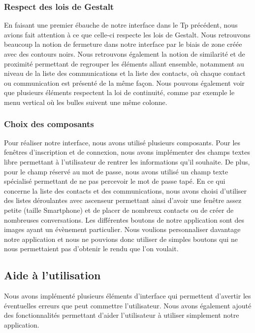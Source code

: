 \documentclass[11pt]{article}
\begin{document}
\subsubsection{Respect des lois de Gestalt}
En faisant une premier ébauche de notre interface dans le Tp précédent, nous avions fait attention à ce que celle-ci respecte les lois de Gestalt. Nous retrouvons beaucoup la notion de fermeture dans notre interface par le biais de zone créée avec des contours noirs. Nous retrouvons également la notion de similarité et de proximité permettant de regrouper les éléments allant ensemble, notamment au niveau de la liste des communications et la liste des contacts, où chaque contact ou communication est présenté de la même façon. Nous pouvons également voir que plusieurs éléments respectent la loi de continuité, comme par exemple le menu vertical où les bulles suivent une même colonne.

\subsubsection{Choix des composants}
Pour réaliser notre interface, nous avons utilisé plusieurs composants. Pour les fenêtres d'inscription et de connexion, nous avons implémenter des champs textes libre permettant à l'utilisateur de rentrer les informations qu'il souhaite. De plus, pour le champ réservé au mot de passe, nous avons utilisé un champ texte spécialisé permettant de ne pas percevoir le mot de passe tapé. En ce qui concerne la liste des contacts et des communications, nous avons choisi d'utiliser des listes déroulantes avec ascenseur permettant ainsi d'avoir une fenêtre assez petite (taille Smartphone) et de placer de nombreux contacts ou de créer de nombreuses conversations. Les différentes boutons de notre application sont des images ayant un évènement particulier. Nous voulions personnaliser davantage notre application et nous ne pouvions donc utiliser de simples boutons qui ne nous permettaient pas d'obtenir le rendu que l'on voulait.

\subsection{Aide à l'utilisation}
Nous avons implémenté plusieurs éléments d'interface qui permettent d'avertir les éventuelles erreurs que peut commettre l'utilisateur. Nous avons également ajouté des fonctionnalités permettant d'aider l'utilisateur à utiliser simplement notre application.
\end{document}
